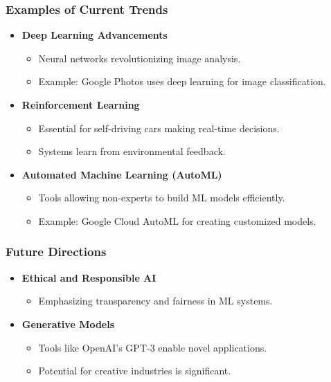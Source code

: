 \documentclass[aspectratio=169]{beamer}
\begin{document}
\begin{frame}[fragile]
    \frametitle{Examples of Current Trends}
    \begin{itemize}
        \item \textbf{Deep Learning Advancements}
            \begin{itemize}
                \item Neural networks revolutionizing image analysis.
                \item Example: Google Photos uses deep learning for image classification.
            \end{itemize}
        \item \textbf{Reinforcement Learning}
            \begin{itemize}
                \item Essential for self-driving cars making real-time decisions.
                \item Systems learn from environmental feedback.
            \end{itemize}
        \item \textbf{Automated Machine Learning (AutoML)}
            \begin{itemize}
                \item Tools allowing non-experts to build ML models efficiently.
                \item Example: Google Cloud AutoML for creating customized models.
            \end{itemize}
    \end{itemize}
\end{frame}

\begin{frame}[fragile]
    \frametitle{Future Directions}
    \begin{itemize}
        \item \textbf{Ethical and Responsible AI}
            \begin{itemize}
                \item Emphasizing transparency and fairness in ML systems.
            \end{itemize}
        \item \textbf{Generative Models}
            \begin{itemize}
                \item Tools like OpenAI's GPT-3 enable novel applications.
                \item Potential for creative industries is significant.
            \end{itemize}
    \end{itemize}
\end{frame}
\end{document}
